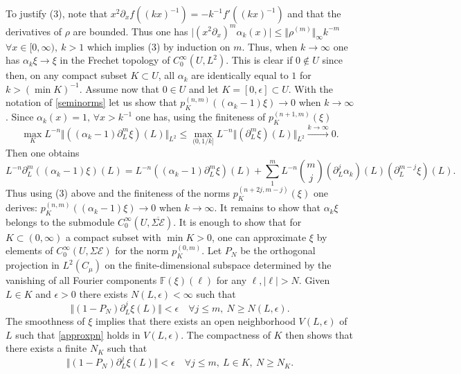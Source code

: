 \documentclass{pspum-l}
\theoremstyle{definition}
\theoremstyle{remark}
\numberwithin{equation}{section}
\def\F{{\mathbb F}}
\def\cE{{\mathcal E}}
\def\fourier{\F}
\begin{document}
 To justify  (3), note that $x^2\partial_x f((kx)^{-1})=-k^{-1}f'((kx)^{-1})$ and that the derivatives of $\rho$ are bounded. Thus one has 
 $\vert(x^2\partial_x)^m\alpha_k(x)\vert\leq \Vert \rho^{(m)}\Vert_{\infty} k^{-m}$ $\forall x\in [0,\infty),~ k>1$ which implies (3) by induction on $m$.\newline
 Thus, when $k\to \infty$ one has $\alpha_k\xi \to \xi$ in the Frechet topology of $C_0^{\infty}(U,L^2)$. This is clear if $0\notin U$ since then, on any  compact subset $K\subset U$, all $\alpha_k$ are identically equal to $1$ for $k>(\min K)^{-1}$. Assume now that $0\in U$ and let $K=[0,\epsilon]\subset U$. With the notation of \eqref{seminorms} let us show that $p_K^{(n,m)}((\alpha_k-1)\xi)\to 0$ when $k\to \infty$. Since $\alpha_k(x)=1, \, \forall x>k^{-1}$ one has, using the finiteness of $p_K^{(n+1,m)}(\xi)$
 \[
  \max_K L^{-n} \Vert ((\alpha_k-1) \partial_L^m \xi)(L)\Vert_{L^2}\leq 
  \max_{(0,1/k]} L^{-n} \Vert (\partial_L^m \xi)(L)\Vert_{L^2}\stackrel{k\to \infty}{\to} 0.
 \]
 Then one obtains
\[
L^{-n} \partial_L^m((\alpha_k-1) \xi)(L)=L^{-n}((\alpha_k-1) \partial_L^m \xi)(L)+\sum_1^m L^{-n} {m\choose j}(\partial_L^j \alpha_k)(L) (\partial_L^{m-j} \xi)(L).
\]
 Thus using (3) above and the finiteness of the norms $p_K^{(n+2j,m-j)}(\xi)$ one derives: $p_K^{(n,m)}((\alpha_k-1)\xi)\to 0$ when $k\to \infty$. It remains to show that $\alpha_k \xi$  belongs to the submodule 	$C_0^{\infty}(U,\overline{\Sigma\cE})$. It is enough to show that for $K\subset (0,\infty)$  a compact subset with $\min K>0$, one can approximate $\xi$  by elements of $C_0^{\infty}(U,\Sigma\cE)$ for the norm $p_K^{(0,m)}$. Let $P_N$ be the orthogonal projection in $L^2(C_\mu)$ on the finite-dimensional subspace determined by the vanishing of all Fourier components $\fourier(\xi)(\ell)$ for any $\ell, \vert \ell\vert>N$. Given $L\in K$ and $\epsilon >0$ there exists $N(L,\epsilon)<\infty$ such that 
 \begin{equation}\label{approxpn}
 \Vert (1-P_N)\partial_L^j\xi(L)\Vert <\epsilon \quad \forall j\leq m, \ N\geq N(L,\epsilon).
 \end{equation}
 The smoothness of $\xi$ implies that there exists an open neighborhood $V(L,\epsilon)$ of $L$ such that \eqref{approxpn} holds in $V(L,\epsilon)$. The compactness of $K$ then shows that there exists a finite $N_K$ such that 
 \begin{equation*}\label{approxpn1}
 \Vert (1-P_N)\partial_L^j\xi(L)\Vert <\epsilon \quad \forall j\leq m, \ L\in K, \ N\geq N_K.
 \end{equation*} 
\end{document}
